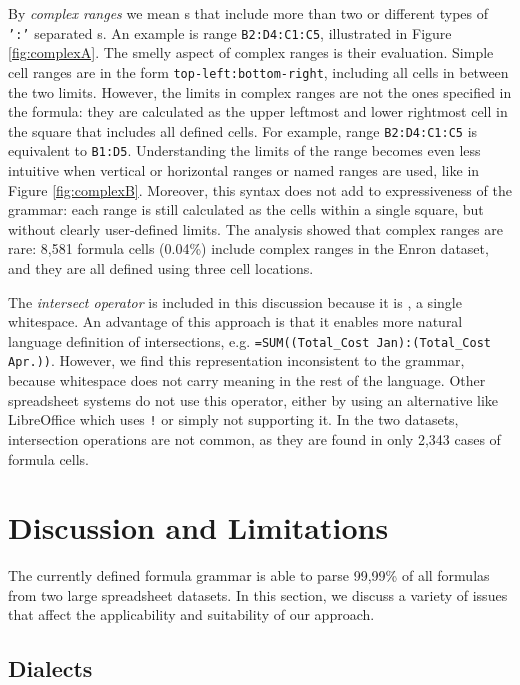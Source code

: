\documentclass[conference]{IEEEtran}
\begin{document}
By \textit{complex ranges} we mean s that include more than two or different types of \texttt{':'} separated s. An example is range \texttt{B2:D4:C1:C5}, illustrated in Figure \ref{fig:complexA}. The smelly aspect of complex ranges is their evaluation. Simple cell ranges are in the form \texttt{top-left:bottom-right}, including all cells in between the two limits. However, the limits in complex ranges are not the ones specified in the formula: they are calculated as the upper leftmost and lower rightmost cell in the square that includes all defined cells. For example, range \texttt{B2:D4:C1:C5} is equivalent to \texttt{B1:D5}. Understanding the limits of the range becomes even less intuitive when vertical or horizontal ranges or named ranges are used, like in Figure \ref{fig:complexB}. Moreover, this syntax does not add to expressiveness of the grammar: each range is still calculated as the cells within a single square, but without clearly user-defined limits. The analysis showed that complex ranges are rare: 8,581 formula cells	(0.04\%) include complex ranges in the Enron dataset, and they are all defined using three cell locations. 

The \textit{intersect operator} is included in this discussion because it is \texttt{}, a single whitespace.
An advantage of this approach is that it enables more natural language definition of intersections, e.g. \texttt{=SUM((Total_Cost Jan):(Total_Cost Apr.))}.
However, we find this representation inconsistent to the grammar, because whitespace does not carry meaning in the rest of the language. Other spreadsheet systems do not use this operator, either by using an alternative like LibreOffice which uses \texttt{!} or simply not supporting it. In the two datasets, intersection operations are not common, as they are found in only 2,343 cases of formula cells.

\section{Discussion and Limitations}
\label{sec:discussion}
The currently defined formula grammar is able to parse 99,99\% of all formulas from two large spreadsheet datasets. In this section, we discuss a variety of issues that affect the applicability and suitability of our approach.

\subsection{Dialects}
\end{document}
